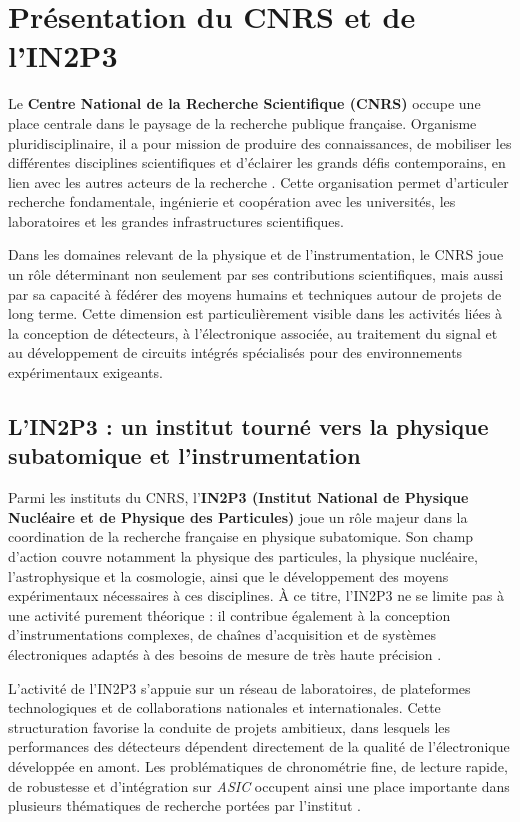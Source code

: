 
\chapter{Présentation du CNRS et de l’IN2P3}
\label{chap:cnrs-in2p3}
\justifying
\sloppy

Le \textbf{Centre National de la Recherche Scientifique (CNRS)} occupe une place centrale dans le paysage de la recherche publique française. Organisme pluridisciplinaire, il a pour mission de produire des connaissances, de mobiliser les différentes disciplines scientifiques et d’éclairer les grands défis contemporains, en lien avec les autres acteurs de la recherche \cite{cnrs2025lecnrs}. Cette organisation permet d’articuler recherche fondamentale, ingénierie et coopération avec les universités, les laboratoires et les grandes infrastructures scientifiques.

Dans les domaines relevant de la physique et de l’instrumentation, le CNRS joue un rôle déterminant non seulement par ses contributions scientifiques, mais aussi par sa capacité à fédérer des moyens humains et techniques autour de projets de long terme. Cette dimension est particulièrement visible dans les activités liées à la conception de détecteurs, à l’électronique associée, au traitement du signal et au développement de circuits intégrés spécialisés pour des environnements expérimentaux exigeants.

\section{L’IN2P3 : un institut tourné vers la physique subatomique et l’instrumentation}

Parmi les instituts du CNRS, l’\textbf{IN2P3 (Institut National de Physique Nucléaire et de Physique des Particules)} joue un rôle majeur dans la coordination de la recherche française en physique subatomique. Son champ d’action couvre notamment la physique des particules, la physique nucléaire, l’astrophysique et la cosmologie, ainsi que le développement des moyens expérimentaux nécessaires à ces disciplines. À ce titre, l’IN2P3 ne se limite pas à une activité purement théorique : il contribue également à la conception d’instrumentations complexes, de chaînes d’acquisition et de systèmes électroniques adaptés à des besoins de mesure de très haute précision \cite{in2p32025presentation}.

L’activité de l’IN2P3 s’appuie sur un réseau de laboratoires, de plateformes technologiques et de collaborations nationales et internationales. Cette structuration favorise la conduite de projets ambitieux, dans lesquels les performances des détecteurs dépendent directement de la qualité de l’électronique développée en amont. Les problématiques de chronométrie fine, de lecture rapide, de robustesse et d’intégration sur \textit{ASIC} occupent ainsi une place importante dans plusieurs thématiques de recherche portées par l’institut \cite{in2p32025presentation}.

